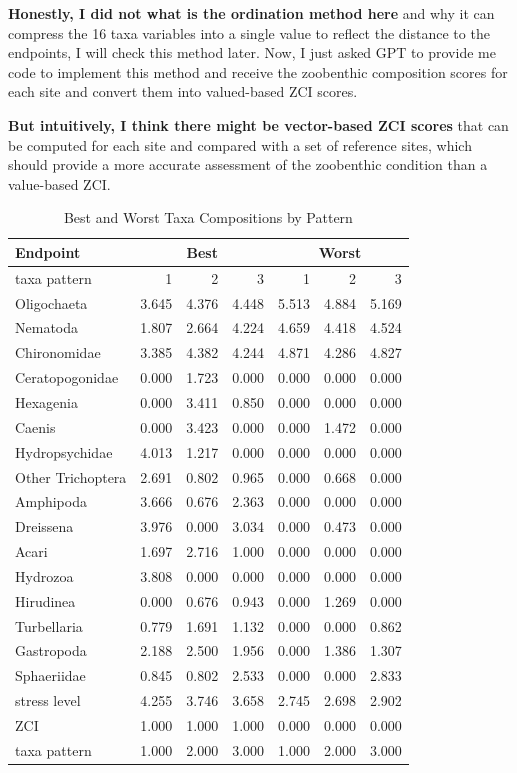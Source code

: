 \textbf{Honestly, I did not what is the ordination method here} and why it can compress the 16 taxa variables into 
a single value to reflect the distance to the endpoints, I will check this method later. Now,
I just asked GPT to provide me code to implement this method and receive the zoobenthic composition scores 
for each site and convert them into valued-based ZCI scores.

\textbf{But intuitively, I think there might be vector-based ZCI scores} that can be computed for each site and compared with 
a set of reference sites, which should provide a more accurate assessment of the zoobenthic condition than a value-based ZCI.



\begin{table}
\centering
\caption{Best and Worst Taxa Compositions by Pattern}
\label{tab:endpoints}
\begin{tabular}{l|rrr|rrr}
\toprule
Endpoint & \multicolumn{3}{c}{\textbf{Best}} & \multicolumn{3}{c}{\textbf{Worst}} \\
\hline
taxa pattern & 1 & 2 & 3 & 1 & 2 & 3 \\
\midrule
Oligochaeta & 3.645 & 4.376 & 4.448 & 5.513 & 4.884 & 5.169 \\
Nematoda & 1.807 & 2.664 & 4.224 & 4.659 & 4.418 & 4.524 \\
Chironomidae & 3.385 & 4.382 & 4.244 & 4.871 & 4.286 & 4.827 \\
Ceratopogonidae & 0.000 & 1.723 & 0.000 & 0.000 & 0.000 & 0.000 \\
Hexagenia & 0.000 & 3.411 & 0.850 & 0.000 & 0.000 & 0.000 \\
Caenis & 0.000 & 3.423 & 0.000 & 0.000 & 1.472 & 0.000 \\
Hydropsychidae & 4.013 & 1.217 & 0.000 & 0.000 & 0.000 & 0.000 \\
Other Trichoptera & 2.691 & 0.802 & 0.965 & 0.000 & 0.668 & 0.000 \\
Amphipoda & 3.666 & 0.676 & 2.363 & 0.000 & 0.000 & 0.000 \\
Dreissena & 3.976 & 0.000 & 3.034 & 0.000 & 0.473 & 0.000 \\
Acari & 1.697 & 2.716 & 1.000 & 0.000 & 0.000 & 0.000 \\
Hydrozoa & 3.808 & 0.000 & 0.000 & 0.000 & 0.000 & 0.000 \\
Hirudinea & 0.000 & 0.676 & 0.943 & 0.000 & 1.269 & 0.000 \\
Turbellaria & 0.779 & 1.691 & 1.132 & 0.000 & 0.000 & 0.862 \\
Gastropoda & 2.188 & 2.500 & 1.956 & 0.000 & 1.386 & 1.307 \\
Sphaeriidae & 0.845 & 0.802 & 2.533 & 0.000 & 0.000 & 2.833 \\
\midrule
stress level & 4.255 & 3.746 & 3.658 & 2.745 & 2.698 & 2.902 \\
ZCI & 1.000 & 1.000 & 1.000 & 0.000 & 0.000 & 0.000 \\
taxa pattern & 1.000 & 2.000 & 3.000 & 1.000 & 2.000 & 3.000 \\
\bottomrule
\end{tabular}
\end{table}

